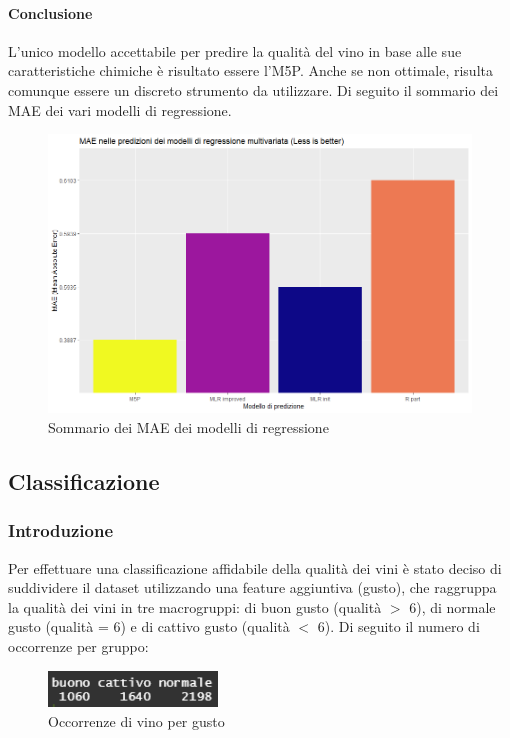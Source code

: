 \documentclass[12pt]{article}
\begin{document}
\paragraph{Conclusione} L'unico modello accettabile per predire la qualità del vino in base alle sue caratteristiche chimiche è risultato essere l'M5P. Anche se non ottimale, risulta comunque essere un discreto strumento da utilizzare. Di seguito il sommario dei MAE dei vari modelli di regressione.
\begin{figure}[!htb]
    \centering
    \includegraphics[width=1\textwidth]{immagini/mae.png}
    \caption{Sommario dei MAE dei modelli di regressione}
\end{figure}
\FloatBarrier
\newpage
\subsection{Classificazione}
\subsubsection{Introduzione}
Per effettuare una classificazione affidabile della qualità dei vini è stato deciso di suddividere il dataset utilizzando una feature aggiuntiva (gusto), che raggruppa la qualità dei vini in tre macrogruppi: di buon gusto (qualità $>$ 6), di normale gusto (qualità = 6) e di cattivo gusto (qualità $<$ 6). Di seguito il numero di occorrenze per gruppo:
\begin{figure}[!htb]
    \centering
    \includegraphics[width=0.4\textwidth]{immagini/gusto.png}
    \caption{Occorrenze di vino per gusto}
\end{figure}
\FloatBarrier
\newpage
\end{document}
